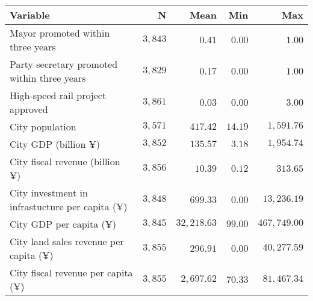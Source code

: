 \begin{longtable}{lrrrr}
\toprule
Variable & N & Mean & Min & Max \\ 
\midrule
Mayor promoted within three years & $3,843$ & $0.41$ & $0.00$ & $1.00$ \\ 
Party secretary promoted within three years & $3,829$ & $0.17$ & $0.00$ & $1.00$ \\ 
High-speed rail project approved & $3,861$ & $0.03$ & $0.00$ & $3.00$ \\ 
City population & $3,571$ & $417.42$ & $14.19$ & $1,591.76$ \\ 
City GDP (billion ¥) & $3,852$ & $135.57$ & $3.18$ & $1,954.74$ \\ 
City fiscal revenue (billion ¥) & $3,856$ & $10.39$ & $0.12$ & $313.65$ \\ 
City investment in infrastucture per capita (¥) & $3,848$ & $699.33$ & $0.00$ & $13,236.19$ \\ 
City GDP per capita (¥) & $3,845$ & $32,218.63$ & $99.00$ & $467,749.00$ \\ 
City land sales revenue per capita (¥) & $3,855$ & $296.91$ & $0.00$ & $40,277.59$ \\ 
City fiscal revenue per capita (¥) & $3,855$ & $2,697.62$ & $70.33$ & $81,467.34$ \\ 
\bottomrule
\end{longtable}

